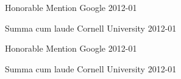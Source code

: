 




\begin{cvhonors}

  \cvhonor
    {Honorable Mention} %
    {Google} %
    {} %
    {2012-01} %


  \cvhonor
    {Summa cum laude} %
    {Cornell University} %
    {} %
    {2012-01} %


\end{cvhonors}




\begin{cvhonors}

  \cvhonor
  {Honorable Mention} %
  {Google} %
  {} %
  {2012-01} %


  \cvhonor
  {Summa cum laude} %
  {Cornell University} %
  {} %
  {2012-01} %


\end{cvhonors}

